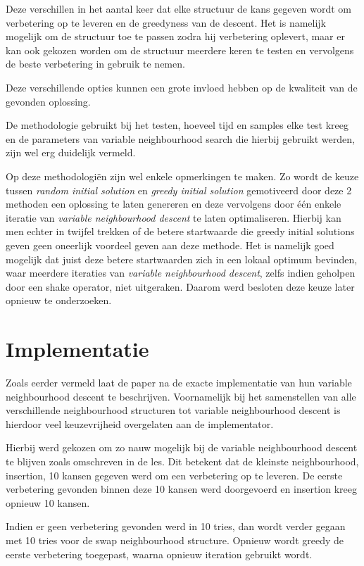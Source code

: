 \documentclass[pdftex,12pt,a4paper]{article}
\begin{document}
Deze verschillen in het aantal keer dat elke structuur de kans gegeven wordt om verbetering op te leveren en de greedyness van de descent. Het is namelijk mogelijk om de structuur toe te passen zodra hij verbetering oplevert, maar er kan ook gekozen worden om de structuur meerdere keren te testen en vervolgens de beste verbetering in gebruik te nemen.

Deze verschillende opties kunnen een grote invloed hebben op de kwaliteit van de gevonden oplossing.

De methodologie gebruikt bij het testen, hoeveel tijd en samples elke test kreeg en de parameters van variable neighbourhood search die hierbij gebruikt werden, zijn wel erg duidelijk vermeld.

Op deze methodologi\"en zijn wel enkele opmerkingen te maken. Zo wordt de keuze tussen \emph{random initial solution} en \emph{greedy initial solution} gemotiveerd door deze 2 methoden een oplossing te laten genereren en deze vervolgens door \'e\'en enkele iteratie van \emph{variable neighbourhood descent} te laten optimaliseren. 
Hierbij kan men echter in twijfel trekken of de betere startwaarde die greedy initial solutions geven  geen oneerlijk voordeel geven aan deze methode. Het is namelijk goed mogelijk dat juist deze betere startwaarden zich in een lokaal optimum bevinden, waar meerdere iteraties van \emph{variable neighbourhood descent}, zelfs indien geholpen door een shake operator, niet uitgeraken. Daarom werd besloten deze keuze later opnieuw te onderzoeken.

\section{Implementatie}
Zoals eerder vermeld laat de paper na de exacte implementatie van hun variable neighbourhood descent te beschrijven. Voornamelijk bij het samenstellen van alle verschillende neighbourhood structuren tot variable neighbourhood descent is hierdoor veel keuzevrijheid overgelaten aan de implementator.

Hierbij werd gekozen om zo nauw mogelijk bij de variable neighbourhood descent te blijven zoals omschreven in de les. Dit betekent dat de kleinste neighbourhood, insertion, 10 kansen gegeven werd om een verbetering op te leveren.
De eerste verbetering gevonden binnen deze 10 kansen werd doorgevoerd en insertion kreeg opnieuw 10 kansen.

Indien er geen verbetering gevonden werd in 10 tries, dan wordt verder gegaan met 10 tries voor de swap neighbourhood structure. Opnieuw wordt greedy de eerste verbetering toegepast, waarna opnieuw iteration gebruikt wordt.
\end{document}
